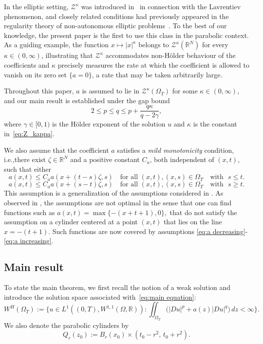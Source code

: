 \documentclass[notitlepage,11pt,reqno]{amsart}
\theoremstyle{definition}
\numberwithin{equation}{section}
\newcommand{\RR}{\mathds{R}}
\begin{document}
In the elliptic setting, $\mathcal{Z}^{\kappa}$ was introduced
in~\cite{BCFM2023} in connection with the Lavrentiev phenomenon, and
closely related conditions had previously appeared in the regularity theory
of non-autonomous elliptic problems~\cite{HHL_2021, HOK2021, HOK2022}. To the best of
our knowledge, the present paper is the first to use this class in the
parabolic context. As a guiding example, the function $x \mapsto |x|^{\kappa}$
belongs to $\mathcal{Z}^{\kappa}(\RR^N)$ for every $\kappa \in (0,
\infty)$, illustrating that $\mathcal{Z}^{\kappa}$ accommodates
non-H\"older behaviour of the coefficients and $\kappa$
precisely measures the rate at which the coefficient is allowed to vanish on its zero set $\{a=0\}$, a rate that may be taken arbitrarily large.

Throughout this paper, $a$ is assumed to lie in
$\mathcal{Z}^{\kappa}(\Omega_T)$ for some $\kappa \in (0, \infty)$, and our main result is established under the gap bound
\begin{equation}\label{eq:new_upper_bound}
  2 \le p \le q \le p + \frac{q\kappa}{q - 2\gamma},
\end{equation}
where $\gamma \in [0, 1)$ is the H\"older exponent of the solution $u$ and
$\kappa$ is the constant in~\eqref{eq:Z_kappa}.

We also assume that the coefficient $a$ satisfies a \textit{mild monotonicity} condition, i.e.,there exist $\zeta \in \RR^N$ and a positive constant $C_a$, both independent of $(x,t)$, such that either 
\begin{equation}\label{eq:a decreasing}
    a(x,t) \leq C_a a(x+(t-s)\zeta,s) \quad \text{for all } (x,t),(x,s)\in \Omega_T \quad \text{with }\,\, s \leq t.
\end{equation}
\begin{equation}\label{eq:a increasing}
    a(x,t) \leq C_a a(x+(s-t)\zeta,s) \quad \text{for all } (x,t),(x,s)\in \Omega_T \quad \text{with }\,\, s \geq t.
\end{equation}
This assumption is a generalization of the assumptions considered in \cite{SS25}. As observed in \cite{SS25}, the assumptions are not optimal in the sense that one can find functions such as $a(x,t)=\max\{-(x+t+1), 0\},$ that do not satisfy the assumption on a cylinder centered at a point $(x,t)$ that lies on the line $x=-(t+1).$ Such functions are now covered by assumptions \eqref{eq:a decreasing}-\eqref{eq:a increasing}.
 \subsection{Main result} 
To state the main theorem, we first recall the notion of a weak solution and
introduce the solution space associated with~\eqref{eq:main equation}:
\begin{equation*}
  W^H(\Omega_T) := \biggl\{ u \in L^1((0,T), W^{1,1}(\Omega,\RR) ):
  \iint_{\Omega_T} \bigl(|Du|^p + a(z)|Du|^q\bigr) \, dz < \infty \biggr\}.
\end{equation*}
We also denote the parabolic cylinders by
\[
  Q_r(z_0) := B_r(x_0) \times (t_0 - r^2,\, t_0 + r^2).
\]
\end{document}
